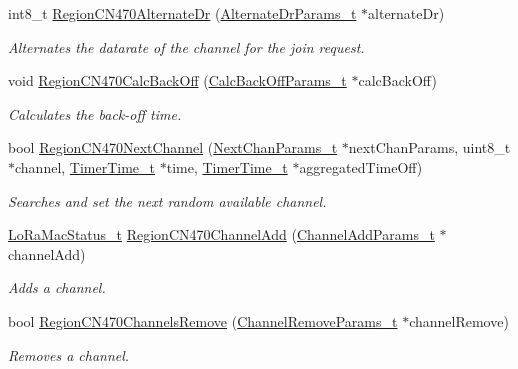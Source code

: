 \begin{DoxyCompactItemize}
int8\+\_\+t \hyperlink{group__REGIONCN470_ga5d07deb9b6a4c9a214439edae58bf341}{Region\+C\+N470\+Alternate\+Dr} (\hyperlink{group__REGION_ga001ea4338d1c83f4c785b49d7ad2d696}{Alternate\+Dr\+Params\+\_\+t} $\ast$alternate\+Dr)
\begin{DoxyCompactList}\small\item\em Alternates the datarate of the channel for the join request. \end{DoxyCompactList}\item 
void \hyperlink{group__REGIONCN470_ga2020e2db0351b7010e2e5fd53c466cc2}{Region\+C\+N470\+Calc\+Back\+Off} (\hyperlink{group__REGION_ga7c5c9a8da174e6679eded8257dc92fd9}{Calc\+Back\+Off\+Params\+\_\+t} $\ast$calc\+Back\+Off)
\begin{DoxyCompactList}\small\item\em Calculates the back-\/off time. \end{DoxyCompactList}\item 
bool \hyperlink{group__REGIONCN470_gad6d2b5fce0ea41dc2416648dcc674287}{Region\+C\+N470\+Next\+Channel} (\hyperlink{group__REGION_ga115f5e83afae352c0a3dcdc193374040}{Next\+Chan\+Params\+\_\+t} $\ast$next\+Chan\+Params, uint8\+\_\+t $\ast$channel, \hyperlink{utilities_8h_a4215ca43d3e953099ea758ce428599d0}{Timer\+Time\+\_\+t} $\ast$time, \hyperlink{utilities_8h_a4215ca43d3e953099ea758ce428599d0}{Timer\+Time\+\_\+t} $\ast$aggregated\+Time\+Off)
\begin{DoxyCompactList}\small\item\em Searches and set the next random available channel. \end{DoxyCompactList}\item 
\hyperlink{group__LORAMAC_ga30bd25657e10480f8605ee951b0ecfbd}{Lo\+Ra\+Mac\+Status\+\_\+t} \hyperlink{group__REGIONCN470_ga6f447bc77fedcf05b61c6a4247b0972b}{Region\+C\+N470\+Channel\+Add} (\hyperlink{group__REGION_gab1c5f3aa06614283202906cef4417860}{Channel\+Add\+Params\+\_\+t} $\ast$channel\+Add)
\begin{DoxyCompactList}\small\item\em Adds a channel. \end{DoxyCompactList}\item 
bool \hyperlink{group__REGIONCN470_ga325aac904d27927672021106fc718f09}{Region\+C\+N470\+Channels\+Remove} (\hyperlink{group__REGION_gaa37468560d2fc81a977b57a48e5d72c0}{Channel\+Remove\+Params\+\_\+t} $\ast$channel\+Remove)
\begin{DoxyCompactList}\small\item\em Removes a channel. \end{DoxyCompactList}\item 

\end{DoxyCompactItemize}
